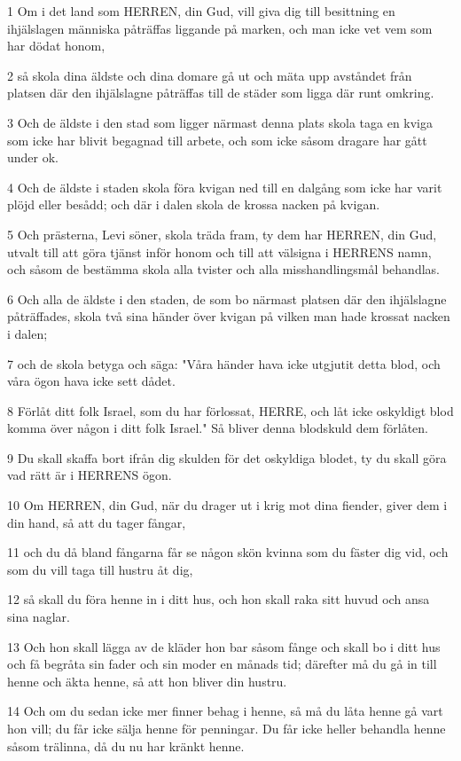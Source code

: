 \par 1 Om i det land som HERREN, din Gud, vill giva dig till besittning en ihjälslagen människa påträffas liggande på marken, och man icke vet vem som har dödat honom,
\par 2 så skola dina äldste och dina domare gå ut och mäta upp avståndet från platsen där den ihjälslagne påträffas till de städer som ligga där runt omkring.
\par 3 Och de äldste i den stad som ligger närmast denna plats skola taga en kviga som icke har blivit begagnad till arbete, och som icke såsom dragare har gått under ok.
\par 4 Och de äldste i staden skola föra kvigan ned till en dalgång som icke har varit plöjd eller besådd; och där i dalen skola de krossa nacken på kvigan.
\par 5 Och prästerna, Levi söner, skola träda fram, ty dem har HERREN, din Gud, utvalt till att göra tjänst inför honom och till att välsigna i HERRENS namn, och såsom de bestämma skola alla tvister och alla misshandlingsmål behandlas.
\par 6 Och alla de äldste i den staden, de som bo närmast platsen där den ihjälslagne påträffades, skola två sina händer över kvigan på vilken man hade krossat nacken i dalen;
\par 7 och de skola betyga och säga: "Våra händer hava icke utgjutit detta blod, och våra ögon hava icke sett dådet.
\par 8 Förlåt ditt folk Israel, som du har förlossat, HERRE, och låt icke oskyldigt blod komma över någon i ditt folk Israel." Så bliver denna blodskuld dem förlåten.
\par 9 Du skall skaffa bort ifrån dig skulden för det oskyldiga blodet, ty du skall göra vad rätt är i HERRENS ögon.
\par 10 Om HERREN, din Gud, när du drager ut i krig mot dina fiender, giver dem i din hand, så att du tager fångar,
\par 11 och du då bland fångarna får se någon skön kvinna som du fäster dig vid, och som du vill taga till hustru åt dig,
\par 12 så skall du föra henne in i ditt hus, och hon skall raka sitt huvud och ansa sina naglar.
\par 13 Och hon skall lägga av de kläder hon bar såsom fånge och skall bo i ditt hus och få begråta sin fader och sin moder en månads tid; därefter må du gå in till henne och äkta henne, så att hon bliver din hustru.
\par 14 Och om du sedan icke mer finner behag i henne, så må du låta henne gå vart hon vill; du får icke sälja henne för penningar. Du får icke heller behandla henne såsom trälinna, då du nu har kränkt henne.
